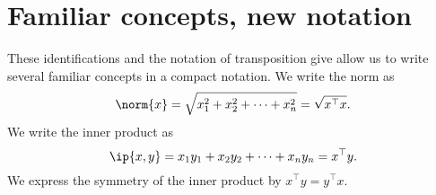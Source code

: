 \section*{Familiar concepts, new notation}

These identifications and the notation of transposition give allow us to write several familiar concepts in a compact notation.
We write the norm as
\[
\norm{x} = \sqrt{x_1^2 + x_2^2 + \cdots + x_n^2} = \sqrt{x^\top  x}.
\]
We write the inner product as
\[
\ip{x,y} =
x_1y_1 + x_2y_2 + \cdots + x_ny_n
= x^\top  y.
\]
We express the symmetry of the inner product by $x^\top  y = y^\top  x$.

